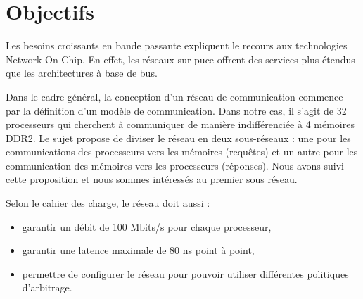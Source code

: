 \section{Objectifs}

Les besoins croissants en bande passante expliquent le recours
aux technologies Network On Chip. En effet, les réseaux sur puce offrent des
services plus étendus que les architectures à base de bus.


Dans le cadre général, la conception d'un réseau de communication commence
par la définition d'un modèle de communication. Dans notre cas, il s'agit de 32
processeurs qui cherchent à communiquer de manière indifférenciée à 4 mémoires
DDR2. Le sujet propose de diviser le réseau en deux sous-réseaux : une pour les
communications des processeurs vers les mémoires (requêtes) et un autre pour les
communication des mémoires vers les processeurs (réponses). Nous avons suivi
cette proposition et nous sommes intéressés au premier sous réseau.

Selon le cahier des charge, le réseau doit aussi :
\begin{itemize}
  \item garantir un débit de 100 Mbits/s pour chaque processeur,
  \item garantir une latence maximale de 80 ns point à point,
  \item permettre de configurer le réseau pour pouvoir utiliser différentes
    politiques d'arbitrage.
\end{itemize}

